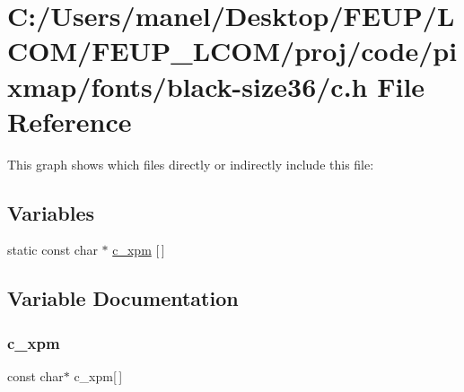 \hypertarget{black-size36_2c_8h}{}\section{C\+:/\+Users/manel/\+Desktop/\+F\+E\+U\+P/\+L\+C\+O\+M/\+F\+E\+U\+P\+\_\+\+L\+C\+O\+M/proj/code/pixmap/fonts/black-\/size36/c.h File Reference}
\label{black-size36_2c_8h}
This graph shows which files directly or indirectly include this file\+:
\subsection*{Variables}
\begin{DoxyCompactItemize}
\item 
static const char $\ast$ \mbox{\hyperlink{black-size36_2c_8h_a71c0fe54d78fe9ca579b9d9923daca82}{c\+\_\+xpm}} \mbox{[}$\,$\mbox{]}
\end{DoxyCompactItemize}


\subsection{Variable Documentation}
\mbox{\label{black-size36_2c_8h_a71c0fe54d78fe9ca579b9d9923daca82}} 
\subsubsection{\texorpdfstring{c\_xpm}{c\_xpm}}
{\footnotesize\ttfamily const char$\ast$ c\+\_\+xpm\mbox{[}$\,$\mbox{]}\hspace{0.3cm}{\ttfamily [static]}}

